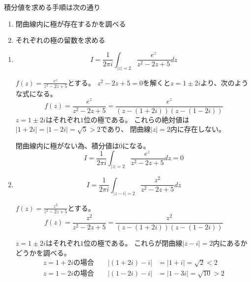 \documentclass[10pt,b5paper]{ltjsarticle}
\begin{document}
\hrulefill

積分値を求める手順は次の通り

\begin{enumerate}
 \item 閉曲線内に極が存在するかを調べる
 \item それぞれの極の留数を求める
\end{enumerate}

\begin{enumerate}\renewcommand{\theenumi}{(\arabic{enumi})}
 \item
      \begin{equation}
       I = \frac{1}{2\pi i}\int_{\lvert z \rvert = 2}\frac{e^z}{z^2-2z+5}dz
      \end{equation}

      $f(z)=\frac{e^z}{z^2-2z+5}$とする。
      $z^2-2z+5=0$を解くと$z=1\pm 2i$より、次のような式になる。
      \begin{equation}
       f(z)=\frac{e^z}{z^2-2z+5}=\frac{e^z}{(z-(1+2i))(z-(1-2i))}
      \end{equation}
      $z=1\pm 2i$はそれぞれ$1$位の極である。
      これらの絶対値は$\lvert 1+2i\lvert = \rvert 1-2i\lvert = \sqrt{5}>2$であり、
      閉曲線$\lvert z \rvert =2$内に存在しない。

      閉曲線内に極がない為、積分値は$0$になる。
      \begin{equation}
       I = \frac{1}{2\pi i}\int_{\lvert z \rvert = 2}\frac{e^z}{z^2-2z+5}dz =0
      \end{equation}
 \item
      \begin{equation}
       I = \frac{1}{2\pi i}\int_{\lvert z-i \rvert = 2}\frac{z^2}{z^2-2z+5}dz
      \end{equation}

      $f(z)=\frac{z^2}{z^2-2z+5}$とする。
      \begin{equation}
       f(z)=\frac{z^2}{z^2-2z+5}=\frac{z^2}{(z-(1+2i))(z-(1-2i))}
      \end{equation}

      $z=1\pm 2i$はそれぞれ$1$位の極である。
      これらが閉曲線$\lvert z-i\lvert=2$内にあるかどうかを調べる。
      \begin{align}
       z=1+2iの場合 \qquad \lvert (1+2i) -i\lvert &= \lvert 1+i \rvert =\sqrt{2} < 2\\
       z=1-2iの場合 \qquad \lvert (1-2i) -i\lvert &= \lvert 1-3i \rvert =\sqrt{10} > 2
      \end{align}


\end{enumerate}
\end{document}
